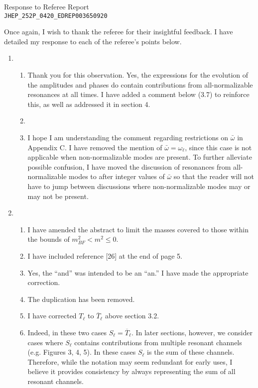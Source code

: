 \documentclass[11pt,letterpaper]{article}
\begin{document}
\vspace{.2in}
\begin{center}
    {\Large Response to Referee Report \\ \verb+JHEP_252P_0420_EDREP003650920+}  
\end{center}

\vspace{.25in}

Once again, I wish to thank the referee for their insightful feedback. I have detailed my response to each of the referee's points below.

\begin{enumerate}
    \item %
    \begin{enumerate}
        \item Thank you for this observation. Yes, the expressions for the evolution of the amplitudes and phases do contain contributions from all-normalizable resonances at all times. I have added a comment below (3.7) to reinforce this, as well as addressed it in section 4.
        \item 
        \item I hope I am understanding the comment regarding restrictions on $\bar\omega$ in Appendix C. I have removed the mention of $\bar\omega = \omega_\ell$, since this case is not applicable when non-normalizable modes are present. To further alleviate possible confusion, I have moved the discussion of resonances from all-normalizable modes to after integer values of $\bar\omega$ so that the reader will not have to jump between discussions where non-normalizable modes may or may not be present.  
    \end{enumerate}
    \item %
    \begin{enumerate}
        \item I have amended the abstract to limit the masses covered to those within the bounds of $m^2_{BF} < m^2 \leq 0$.
        \item I have included reference [26] at the end of page 5. 
        \item Yes, the ``and'' was intended to be an ``an.'' I have made the appropriate correction.
        \item The duplication has been removed.
        \item I have corrected $T_\ell$ to $\overline{T}_\ell$ above section 3.2.
        \item Indeed, in these two cases $S_\ell = \overline{T}_\ell$.  In later sections, however, we consider cases where $S_\ell$ contains contributions from multiple resonant channels (e.g. Figures 3, 4, 5). In these cases $S_\ell$ is the sum of these channels. Therefore, while the notation may seem redundant for early uses, I believe it provides consistency by always representing the sum of all resonant channels. 

\end{enumerate}
\end{enumerate}
\end{document}
